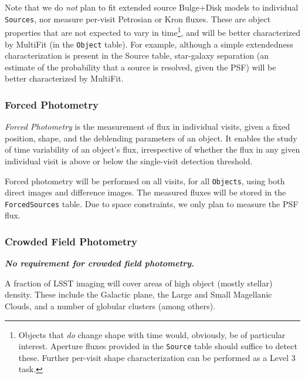\documentclass[12pt]{article}
\newcommand{\code}[1]{\texttt{#1}}
\newcommand{\annotate}[1]{{\color{magenta}\large\textbf{\emph{#1}}}}
\newcommand{\Object}{\code{Object}\xspace}
\newcommand{\Objects}{\code{Objects}\xspace}
\newcommand{\Source}{\code{Source}\xspace}
\newcommand{\Sources}{\code{Sources}\xspace}
\newcommand{\ForcedSources}{\code{ForcedSources}\xspace}
\newcommand{\req}[1]{\marginpar{\tiny #1}}
\newcommand{\dmreq}[1]{\req{DMS-REQ-#1}}
\begin{document}
Note that we do {\em not} plan to fit extended source Bulge+Disk models to individual \Sources, nor measure per-visit Petrosian or Kron fluxes. These are object properties that are not expected to vary in time\footnote{Objects that {\em do} change shape with time would, obviously, be of particular interest. Aperture fluxes provided in the \Source table should suffice to detect these. Further per-visit shape characterization can be performed as a Level 3 task.}, and will be better characterized by MultiFit (in the \Object table).
For example, although a simple extendedness characterization is present in the Source table, star-galaxy separation (an estimate of the probability that a source is resolved, given the PSF) will be better characterized by MultiFit.


\subsubsection{Forced Photometry}
\label{sec:forcedPhotL2}
\dmreq{0268}\dmreq{0287}

{\em Forced Photometry} is the measurement of flux in individual visits, given a fixed position, shape, and the deblending parameters of an object. It enables the study of time variability of an object's flux, irrespective of whether the flux in any given individual visit is above or below the single-visit detection threshold.

Forced photometry will be performed on all visits, for all \Objects, using both direct images and difference images.
The measured fluxes will be stored in the \ForcedSources table. Due to space constraints, we only plan to measure the PSF flux.

\subsubsection{Crowded Field Photometry}

\annotate{No requirement for crowded field photometry.}

A fraction of LSST imaging will cover areas of high object (mostly stellar) density. These include the Galactic plane, the Large and Small Magellanic Clouds, and a number of globular clusters (among others).
\\

\end{document}

